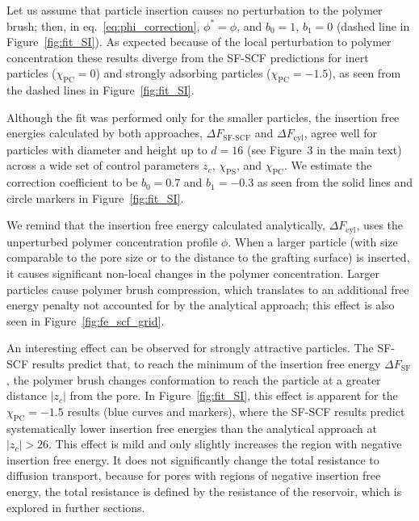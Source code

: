 \documentclass[10pt, a4paper]{article}
\begin{document}
\begin{multicols}{2}
Let us assume that particle insertion causes no perturbation to the polymer brush; then, in eq.~\ref{eq:phi_correction}, $\phi^{\ast} = \phi$, and $b_0 = 1$, $b_1 = 0$ (dashed line in Figure~\ref{fig:fit_SI}).
As expected because of the local perturbation to polymer concentration these results diverge from the SF-SCF predictions for inert particles ($\chi_{\textrm{PC}} = 0$) and strongly adsorbing particles ($\chi_{\textrm{PC}} = -1.5$), as seen from the dashed lines in Figure~\ref{fig:fit_SI}.


Although the fit was performed only for the smaller particles, the insertion free energies calculated by both approaches, $\Delta F_{\textrm{SF-SCF}}$ and $\Delta F_{\textrm{cyl}}$, agree well for particles with diameter and height up to $d = 16$ (see Figure~3 in the main text) across a wide set of control parameters $z_c$, $\chi_{\textrm{PS}}$, and $\chi_{\textrm{PC}}$.
We estimate the correction coefficient to be $b_0=0.7$ and $b_1 = -0.3$ as seen from the solid lines and circle markers in Figure~\ref{fig:fit_SI}.

We remind that the insertion free energy calculated analytically, $\Delta F_{\textrm{cyl}}$, uses the unperturbed polymer concentration profile $\phi$.
When a larger particle (with size comparable to the pore size or to the distance to the grafting surface) is inserted, it causes significant non-local changes in the polymer concentration.
Larger particles cause polymer brush compression, which translates to an additional free energy penalty not accounted for by the analytical approach; this effect is also seen in Figure~\ref{fig:fe_scf_grid}.


An interesting effect can be observed for strongly attractive particles.
The SF-SCF results predict that, to reach the minimum of the insertion free energy $\Delta F_{\textrm{SF}}$, the polymer brush changes conformation to reach the particle at a greater distance $|z_c|$ from the pore.
In Figure~\ref{fig:fit_SI}, this effect is apparent for the $\chi_{\textrm{PC}} = -1.5$ results (blue curves and markers), where the SF-SCF results predict systematically lower insertion free energies than the analytical approach at $|z_c| > 26$.
This effect is mild and only slightly increases the region with negative insertion free energy.
It does not significantly change the total resistance to diffusion transport, because for pores with regions of negative insertion free energy, the total resistance is defined by the resistance of the reservoir, which is explored in further sections.


\end{multicols}
\end{document}
